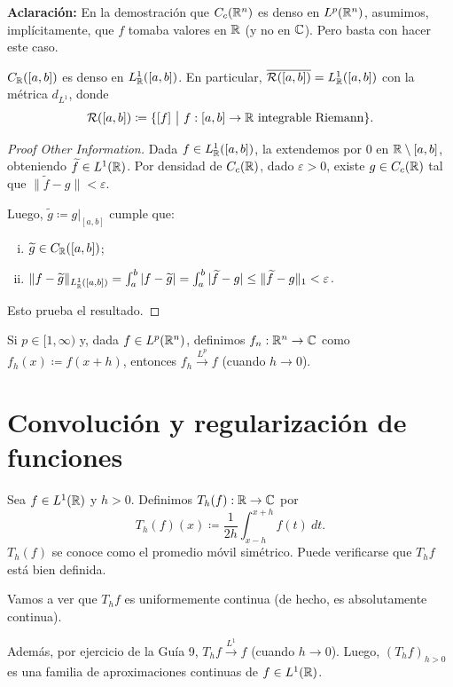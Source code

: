 
\textbf{Aclaración: } En la demostración que $C_{c}(\mathbb{R}^{n})$ es denso en $L^{p}(\mathbb{R}^{n})$, asumimos, implícitamente, que $f$ tomaba valores en $\mathbb{R}$ (y no en $\mathbb{C}$). Pero basta con hacer este caso.

\begin{corollary}
	$C_{\mathbb{R}}([a,b])$ es denso en $L_{\mathbb{R}}^{1}([a,b])$. En particular, $\overline{\mathcal{R}([a,b])} = L_{\mathbb{R}}^{1}([a,b])$ con la métrica $d_{L^{1}}$, donde 
	\[ \mcal{R}([a,b]) \coloneq \{[f] \ \big| \ f : [a,b] \to \R \text{ integrable Riemann}\}. \]
\end{corollary}
\begin{proof}[Proof Other Information]
	Dada $f \in L_{\mathbb{R}}^{1}([a,b])$, la extendemos por $0$ en $\mathbb{R} \setminus [a,b]$, obteniendo $\widetilde{f} \in L^{1}(\mathbb{R})$. Por densidad de $C_{c}(\mathbb{R})$, dado $\varepsilon > 0$, existe $g \in C_{c}(\mathbb{R})$ tal que $\| \widetilde{f} - g \| < \varepsilon$. \par
	Luego, $\widetilde{g} \coloneq g|_{[a,b]}$ cumple que:
	\begin{enumerate}[i.]
		\item $\widetilde{g} \in C_{\mathbb{R}}([a,b])$;

		\item $\| f - \widetilde{g} \|_{L_{\mathbb{R}}^{1}([a,b])} = \int_{a}^{b} | f - \widetilde{g} | = \int_{a}^{b} | \widetilde{f} - g | \leq \| \widetilde{f} - g \|_{1} < \varepsilon$.
	\end{enumerate}
	Esto prueba el resultado.
\end{proof}

\begin{corollary}
	Si $p \in [1, \infty)$ y, dada $f \in L^{p}(\mathbb{R}^{n})$, definimos $f_{n} : \mathbb{R}^{n} \to \mathbb{C}$ como $f_{h}(x) \coloneq f(x + h)$, entonces $f_{h} \stackrel{L^{p}}{\longrightarrow} f$ (cuando $h \longrightarrow 0$).
\end{corollary}

\section{Convolución y regularización de funciones}

\begin{eg}
	Sea $f \in L^{1}(\mathbb{R})$ y $h > 0$. Definimos $T_{h}(f) : \mathbb{R} \to \mathbb{C}$ por 
	\[ T_{h}(f)(x) \coloneq \frac{1}{2h} \int_{x - h}^{x + h} f(t) \ dt. \]
	$T_{h}(f)$ se conoce como el promedio móvil simétrico. Puede verificarse que $T_{h}f$ está bien definida. \par 
	Vamos a ver que $T_{h}f$ es uniformemente continua (de hecho, es absolutamente continua). \par
	Además, por ejercicio de la Guía 9, $T_{h}f \stackrel{L^{1}}{\longrightarrow} f$ (cuando $h \longrightarrow 0$). Luego, $(T_{h}f)_{h > 0}$ es una familia de aproximaciones continuas de $f \in L^{1}(\mathbb{R})$.
\end{eg}

